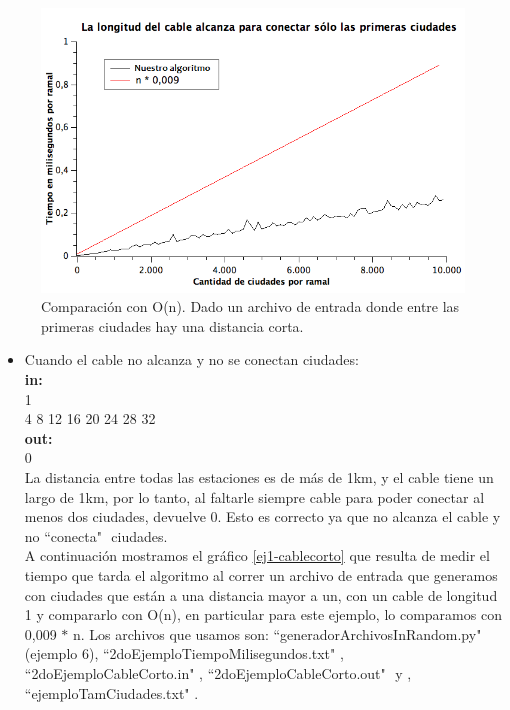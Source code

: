 \begin{figure}[H]
\begin{center}

  \includegraphics[width=\linewidth]{../graficos/ej1/PrimerasCiudades.png}
  \caption{{\small Comparación con O(n). Dado un archivo de entrada donde entre las primeras ciudades hay una distancia corta.}} \label{ej1-primerasciudades}
\endminipage

\end{center}
\end{figure}

\begin{itemize}
\item Cuando el cable no alcanza y no se conectan ciudades:\\
\textbf{in:}\\ 
1\\
4 8 12 16 20 24 28 32 \\
\textbf{out:}\\
0\\

La distancia entre todas las estaciones es de más de 1km, y el cable tiene un largo de 1km, por lo tanto, al faltarle siempre cable para poder conectar al menos dos ciudades, devuelve 0. Esto es correcto ya que no alcanza el cable y no ``conecta" $ $ ciudades. \\

A continuación mostramos el gráfico \ref{ej1-cablecorto} que resulta de medir el tiempo que tarda el algoritmo al correr un archivo de entrada que generamos con ciudades que están a una distancia mayor a un, con un cable de longitud 1 y compararlo con O(n), en particular para este ejemplo, lo comparamos con 0,009 $*$ n. Los archivos que usamos son: ``generadorArchivosInRandom.py" $ $ (ejemplo 6), ``2doEjemploTiempoMilisegundos.txt"  $ $, \\ ``2doEjemploCableCorto.in"  $ $, ``2doEjemploCableCorto.out"  $ $ y , ``ejemploTamCiudades.txt"  $ $.\\

\end{itemize}

